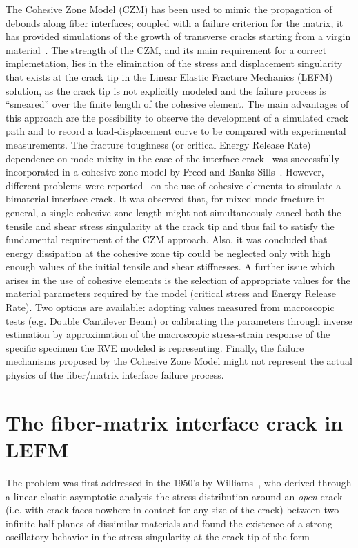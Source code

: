 The Cohesive Zone Model (CZM) has been used to mimic the propagation of debonds along fiber interfaces; coupled with a failure criterion for the matrix, it has provided simulations of the growth of transverse cracks starting from a virgin material~\cite{Kushch2011,Canal2012,Bouhala2013,Herraez2015}. The strength of the CZM, and its main requirement for a correct implemetation, lies in the elimination of the stress and displacement singularity that exists at the crack tip in the Linear Elastic Fracture Mechanics (LEFM) solution, as the crack tip is not explicitly modeled and the failure process is ``smeared'' over the finite length of the cohesive element. The main advantages of this approach are the possibility to observe the development of a simulated crack path and to record a load-displacement curve to be compared with experimental measurements. The fracture toughness (or critical Energy Release Rate) dependence on mode-mixity in the case of the interface crack~\cite{Mantic2009} was successfully incorporated in a cohesive zone model by Freed and Banks-Sills~\cite{Freed2008}. However, different problems were reported~\cite{Jin2005} on the use of cohesive elements to simulate a bimaterial interface crack. It was observed that, for mixed-mode fracture in general, a single cohesive zone length might not simultaneously cancel both the tensile and shear stress singularity at the crack tip and thus fail to satisfy the fundamental requirement of the CZM approach. Also, it was concluded that energy dissipation at the cohesive zone tip could be neglected only with high enough values of the initial tensile and shear stiffnesses. A further issue which arises in the use of cohesive elements is the selection of appropriate values for the material parameters required by the model (critical stress and Energy Release Rate). Two options are available: adopting values measured from macroscopic tests (e.g. Double Cantilever Beam) or calibrating the parameters through inverse estimation by approximation of the macroscopic stress-strain response of the specific specimen the RVE modeled is representing. Finally, the failure mechanisms proposed by the Cohesive Zone Model might not represent the actual physics of the fiber/matrix interface failure process.

\section{The fiber-matrix interface crack in LEFM}

The problem was first addressed in the 1950's by Williams~\cite{Williams1959}, who derived through a linear elastic asymptotic analysis the stress distribution around an \emph{open} crack (i.e. with crack faces nowhere in contact for any size of the crack) between two infinite half-planes of dissimilar materials and found the existence of a strong oscillatory behavior in the stress singularity at the crack tip of the form 

